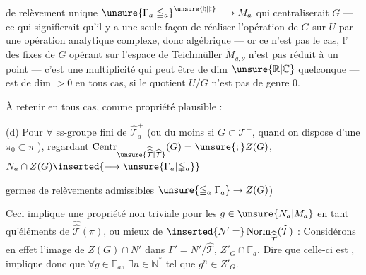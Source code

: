 
 de relèvement unique $\unsure{\Gamma_a|\mathbb{\Gamma}_a}^{\unsure{\natural|\sharp}}\longrightarrow M_a$ qui centraliserait $G$ --- ce qui signifierait qu'il y a  une seule façon de réaliser l'opération  de $G$ sur $U$ par une opération  analytique complexe, donc algébrique --- or ce n'est  pas le cas, l' des  fixes de $G$ opérant sur l'espace de Teichmüller $\widetilde M_{g,\nu}$ n'est pas réduit à un point --- c'est  une multiplicité  qui peut être  de dim $\unsure{\mathbb R|\mathbb C}$ quelconque ---  est de dim $>0$ en tous cas, si le quotient $U/G$ n'est pas de genre $0$.

À retenir en tous cas, comme propriété plausible :

(d) Pour $\forall$ ss-groupe fini  de $\widehat{\mathcal T}_a^+$ (ou du moins si $G\subset\mathcal T^+$, quand on dispose d'une  $\pi_0\subset\pi$ ), regardant $\operatorname{Centr}_{\unsure{\widehat{\widehat{\mathcal T}}|\widehat{\mathcal T}}}(G)=\unsure{;}Z(G)$, $N_a\cap Z(G)\inserted{\longrightarrow\unsure{\Gamma_a|\mathbb{\Gamma}_a}}$  


germes de relèvements admissibles $\unsure{\mathbb{\Gamma}_a|\Gamma_a}\to Z(G)$)

Ceci implique une propriété non triviale pour
les $g\in\unsure{N_a|M_a}$  en tant qu'éléments de $\widehat{\widehat{\mathcal T}}(\pi)$,
ou mieux de $\inserted{N'=}\operatorname{Norm}_{\widehat{\widehat{\mathcal T}}}(\widehat{\mathcal T})$ :
Considérons en effet l'image  de
$Z(G)\cap N'$ dans $\Gamma'=N'/\widehat{\mathcal T}$, 
$Z'_G\cap\mathbb{\Gamma}_a$. Dire que celle-ci est  ,
implique donc que $\forall g\in\mathbb{\Gamma}_a$,  $\exists n\in\mathbb N^{*}$
tel que $g^n\in Z'_G$. 

